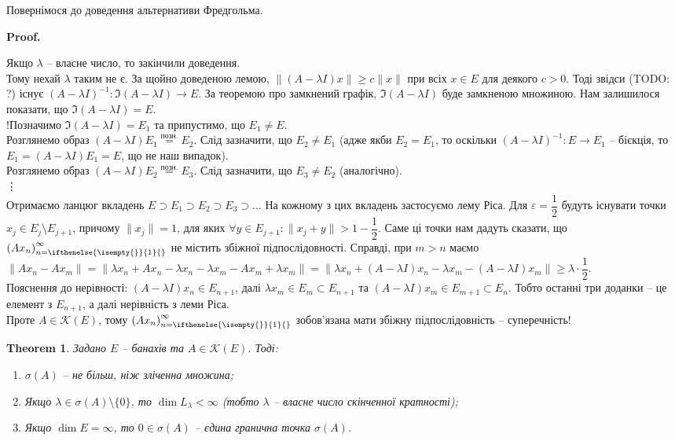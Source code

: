 \documentclass[a4paper, 10pt]{article}
\makeatletter
\theoremstyle{theoremdd}
\newtheorem{theorem}{Theorem}[subsection]
\theoremstyle{theoremdd}
\theoremstyle{theoremdd}
\theoremstyle{theoremdd}
\theoremstyle{theoremdd}
\theoremstyle{theoremdd}
\theoremstyle{theoremdd}
\theoremstyle{theoremdd}
\newcommand{\sequence}[2][]{\left({#2}\right)_{n=\ifthenelse{\isempty{#1}}{1}{#1}}^{\infty}}
\renewenvironment{proof}[1][Proof.\\]{\par
\pushQED{\hfill \qed}%
\normalfont \topsep6\p@\@plus6\p@\relax
\trivlist
\item\relax
{\bfseries
#1\@addpunct{.}}\hspace\labelsep\ignorespaces
}{%
\popQED\endtrivlist\@endpefalse
}
\makeatother
\begin{document}
Повернімося до доведення альтернативи Фредгольма.
\begin{proof}
Якщо $\lambda$ -- власне число, то закінчили доведення.\\
Тому нехай $\lambda$ таким не є. За щойно доведеною лемою, $\|(A-\lambda I)x\| \geq c \|x\|$ при всіх $x \in E$ для деякого $c > 0$. Тоді звідси (TODO: ?) існує $(A-\lambda I)^{-1} \colon \Im(A-\lambda I) \to E$. За теоремою про замкнений графік, $\Im(A-\lambda I)$ буде замкненою множиною. Нам залишилося показати, що $\Im(A-\lambda I) = E$.\\
!Позначимо $\Im(A-\lambda I) = E_1$ та припустимо, що $E_1 \neq E$.\\
Розглянемо образ $(A-\lambda I)E_1 \overset{\text{позн.}}{=} E_2$. Слід зазначити, що $E_2 \neq E_1$ (адже якби $E_2 = E_1$, то оскільки $(A-\lambda I)^{-1} \colon E \to E_1$ -- бієкція, то $E_1 = (A - \lambda I)E_1 = E$, що не наш випадок).\\
Розглянемо образ $(A-\lambda I)E_2 \overset{\text{позн.}}{=} E_3$. Слід зазначити, що $E_3 \neq E_2$ (аналогічно).\\
\vdots \\
Отримаємо ланцюг вкладень $E \supset E_1 \supset E_2 \supset E_3 \supset \dots$ На кожному з цих вкладень застосуємо лему Ріса. Для $\varepsilon = \dfrac{1}{2}$ будуть існувати точки $x_j \in E_j \setminus E_{j+1}$, причому $\|x_j\| = 1$, для яких $\forall y \in E_{j+1}: \|x_j + y\| > 1 - \dfrac{1}{2}$. Саме ці точки нам дадуть сказати, що $\sequence{A x_n}$ не містить збіжної підпослідовності. Справді, при $m > n$ маємо\\
$\| Ax_n - Ax_m \| = \| \lambda x_n + Ax_n - \lambda x_n - \lambda x_m - Ax_m + \lambda x_m \| = \| \lambda x_n + (A-\lambda I)x_n - \lambda x_m - (A-\lambda I)x_m\| \geq \lambda \cdot \dfrac{1}{2}$.\\
Пояснення до нерівності: $(A-\lambda I)x_n \in E_{n+1}$, далі $\lambda x_m \in E_m \subset E_{n+1}$ та $(A-\lambda I) x_m \in E_{m+1} \subset E_n$. Тобто останні три доданки -- це елемент з $E_{n+1}$, а далі нерівність з леми Ріса.\\
Проте $A \in \mathcal{K}(E)$, тому $\sequence{A x_n}$ зобов'язана мати збіжну підпослідовність -- суперечність!
\end{proof}

\begin{theorem}
Задано $E$ -- банахів та $A \in \mathcal{K}(E)$. Тоді:
\begin{enumerate}[nosep,wide=0pt,label={\arabic*)}]
\item $\sigma(A)$ -- не більш, ніж зліченна множина;
\item Якщо $\lambda \in \sigma(A) \setminus \{0\}$, то $\dim L_\lambda < \infty$ (тобто $\lambda$ -- власне число скінченної кратності);
\item Якщо $\dim E = \infty$, то $0 \in \sigma(A)$ -- єдина гранична точка $\sigma(A)$.
\end{enumerate} 
\end{theorem}
\end{document}

